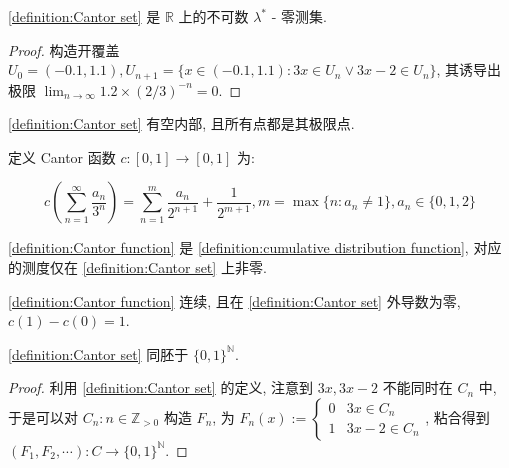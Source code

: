 \begin{lemma}
    \ref{definition:Cantor set} 是 \(\mathbb{R}\) 上的不可数 \(\lambda^\ast\) - 零测集.

    \begin{proof}
        构造开覆盖 \(U_0 = (-0.1,1.1), U_{n+1} = \{x \in (-0.1,1.1):3x \in U_n \lor 3x - 2 \in U_n\}\), 其诱导出极限 \(\lim_{n \to \infty} 1.2 \times {(2/3)}^{-n} = 0\).
    \end{proof}
\end{lemma}

\begin{corollary}
    \ref{definition:Cantor set} 有空内部, 且所有点都是其极限点.
\end{corollary}

\begin{definition}[Cantor 函数]
    \label {definition:Cantor function}
    定义 Cantor 函数 \(c: [0,1] \to [0,1]\) 为:

    \[
        c(\sum_{n=1}^{\infty} \frac{a_n}{3^n}) = \sum_{n=1}^{m} \frac{a_n}{2^{n+1}} + \frac{1}{2^{m+1}}, m = \max \{n: a_n \neq 1\}, a_n \in \{0,1,2\}
    \]
\end{definition}

\begin{corollary}
    \ref{definition:Cantor function} 是 \ref{definition:cumulative distribution function}, 对应的测度仅在 \ref{definition:Cantor set} 上非零.
\end{corollary}

\begin{corollary}
    \ref{definition:Cantor function} 连续, 且在 \ref{definition:Cantor set} 外导数为零, \(c(1) - c(0) = 1\).
\end{corollary}

\begin{lemma}
    \ref{definition:Cantor set} 同胚于 \(\{0,1\}^{\mathbb{N}}\).

    \begin{proof}
        利用 \ref{definition:Cantor set} 的定义, 注意到 \(3x,3x-2\) 不能同时在 \(C_n\) 中, 于是可以对 \(C_n:n \in \mathbb{Z}_{>0}\) 构造 \(F_n\),
        为 \(F_n(x) := \begin{cases}
            0 & 3x \in C_n \\
            1 & 3x - 2 \in C_n
        \end{cases}\), 粘合得到 \((F_1,F_2,\cdots) : C \to \{0,1\}^{\mathbb{N}}\).
    \end{proof}
\end{lemma}

